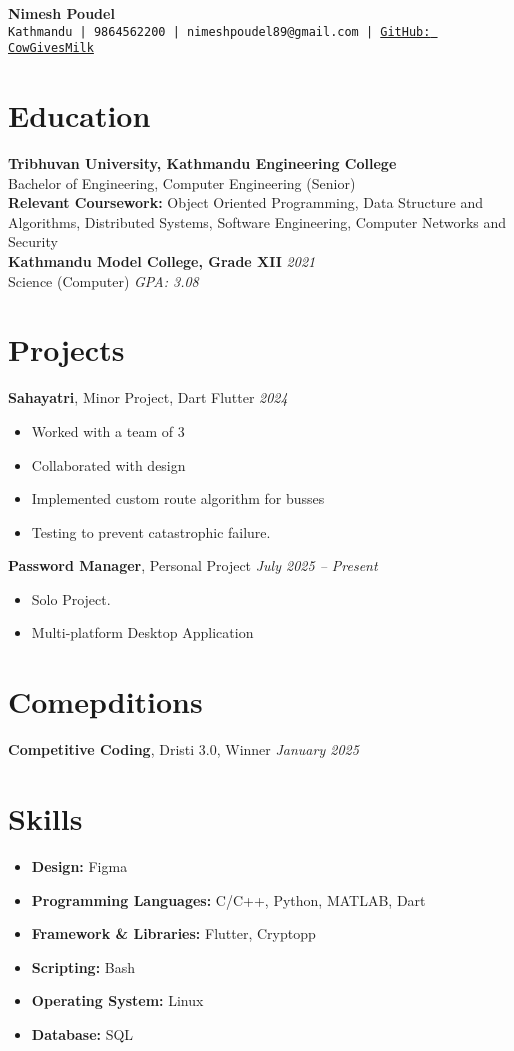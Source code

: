 \documentclass[a4paper, 12pt]{article}
\author{Nimesh Poudel}
\makeatletter
\newcommand{\name}{Nimesh Poudel}
\newcommand{\resumeHeader}{
\begin{center}
{\LARGE \textbf{\name}}\\
\texttt{Kathmandu | 9864562200 | nimeshpoudel89@gmail.com | \href{https://github.com/CowGivesMilk}{GitHub: CowGivesMilk}}
\end{center}
}
\makeatother
\begin{document}
\resumeHeader

\section*{Education}
\textbf{Tribhuvan University, Kathmandu Engineering College}\\
Bachelor of Engineering, Computer Engineering (Senior)\\
\textbf{Relevant Coursework:} Object Oriented Programming, Data Structure and Algorithms,
Distributed Systems, Software Engineering, Computer Networks and Security\\
\textbf{Kathmandu Model College, Grade XII} \hfill \textit{2021}\\
Science (Computer) \hfill \textit{GPA: 3.08}


\section*{Projects}
\textbf{Sahayatri}, Minor Project, Dart Flutter \hfill \textit{2024}
\begin{itemize}
    \item Worked with a team of 3
    \item Collaborated with design
    \item Implemented custom route algorithm for busses
    \item Testing to prevent catastrophic failure.
\end{itemize}

\textbf{Password Manager}, Personal Project \hfill \textit{July 2025 -- Present}
\begin{itemize}
    \item Solo Project.
    \item Multi-platform Desktop Application
\end{itemize}

\section*{Comepditions}
\textbf{Competitive Coding}, Dristi 3.0, Winner \hfill \textit{January 2025}


\section*{Skills}
\begin{itemize}
    \item \textbf{Design:} Figma
    \item \textbf{Programming Languages:} C/C++, Python, MATLAB, Dart
    \item \textbf{Framework \& Libraries:} Flutter, Cryptopp
    \item \textbf{Scripting:} Bash
    \item \textbf{Operating System:} Linux
    \item \textbf{Database:} SQL
\end{itemize}
\end{document}
